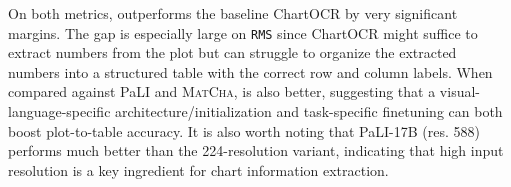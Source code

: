\begin{table}[ht]
    \centering
    \caption{Benchmarking plot-to-table conversion accuracy on the PlotQA dataset (all individual plots in PlotQA test sets). Both a pipeline-bsed based method (ChartOCR) and end-to-end methods (PaLI-17B and \textsc{MatCha}) are used as baselines. \texttt{RMS} can capture the shortcomings of baselines such as ChartOCR with much greater sensitivity.}
    \label{tab:plot_to_table}
\end{table}

On both metrics, \model{} outperforms the baseline ChartOCR by very significant margins. The gap is especially large on \texttt{RMS} since ChartOCR might suffice to extract numbers from the plot but can struggle to organize the extracted numbers into a structured table with the correct row and column labels. When compared against PaLI and \textsc{MatCha}, \model{} is also better, suggesting that a visual-language-specific architecture/initialization and task-specific finetuning can both boost plot-to-table accuracy. It is also worth noting that PaLI-17B (res. 588) performs much better than the 224-resolution variant, indicating that high input resolution is a key ingredient for chart information extraction.

